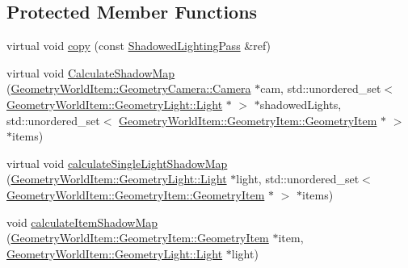 \subsection*{Protected Member Functions}
\begin{DoxyCompactItemize}
\item 
virtual void \mbox{\hyperlink{class_geometry_engine_1_1_geometry_render_step_1_1_shadowed_lighting_pass_add7b889c49a68911f675ee44ab656699}{copy}} (const \mbox{\hyperlink{class_geometry_engine_1_1_geometry_render_step_1_1_shadowed_lighting_pass}{Shadowed\+Lighting\+Pass}} \&ref)
\item 
virtual void \mbox{\hyperlink{class_geometry_engine_1_1_geometry_render_step_1_1_shadowed_lighting_pass_a6365f5d2036ee96eae06074917f691f3}{Calculate\+Shadow\+Map}} (\mbox{\hyperlink{class_geometry_engine_1_1_geometry_world_item_1_1_geometry_camera_1_1_camera}{Geometry\+World\+Item\+::\+Geometry\+Camera\+::\+Camera}} $\ast$cam, std\+::unordered\+\_\+set$<$ \mbox{\hyperlink{class_geometry_engine_1_1_geometry_world_item_1_1_geometry_light_1_1_light}{Geometry\+World\+Item\+::\+Geometry\+Light\+::\+Light}} $\ast$ $>$ $\ast$shadowed\+Lights, std\+::unordered\+\_\+set$<$ \mbox{\hyperlink{class_geometry_engine_1_1_geometry_world_item_1_1_geometry_item_1_1_geometry_item}{Geometry\+World\+Item\+::\+Geometry\+Item\+::\+Geometry\+Item}} $\ast$ $>$ $\ast$items)
\item 
virtual void \mbox{\hyperlink{class_geometry_engine_1_1_geometry_render_step_1_1_shadowed_lighting_pass_ae4697bc2c2f0e29af5bdceec94354541}{calculate\+Single\+Light\+Shadow\+Map}} (\mbox{\hyperlink{class_geometry_engine_1_1_geometry_world_item_1_1_geometry_light_1_1_light}{Geometry\+World\+Item\+::\+Geometry\+Light\+::\+Light}} $\ast$light, std\+::unordered\+\_\+set$<$ \mbox{\hyperlink{class_geometry_engine_1_1_geometry_world_item_1_1_geometry_item_1_1_geometry_item}{Geometry\+World\+Item\+::\+Geometry\+Item\+::\+Geometry\+Item}} $\ast$ $>$ $\ast$items)
\item 
\mbox{\label{class_geometry_engine_1_1_geometry_render_step_1_1_shadowed_lighting_pass_af8c4ac2fc09992fc55abd37ede6bef7b}} 
void \mbox{\hyperlink{class_geometry_engine_1_1_geometry_render_step_1_1_shadowed_lighting_pass_af8c4ac2fc09992fc55abd37ede6bef7b}{calculate\+Item\+Shadow\+Map}} (\mbox{\hyperlink{class_geometry_engine_1_1_geometry_world_item_1_1_geometry_item_1_1_geometry_item}{Geometry\+World\+Item\+::\+Geometry\+Item\+::\+Geometry\+Item}} $\ast$item, \mbox{\hyperlink{class_geometry_engine_1_1_geometry_world_item_1_1_geometry_light_1_1_light}{Geometry\+World\+Item\+::\+Geometry\+Light\+::\+Light}} $\ast$light)

\end{DoxyCompactItemize}
